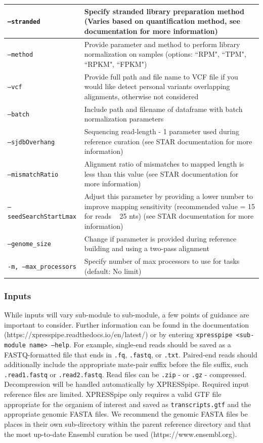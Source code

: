 \documentclass[10pt, oneside]{article}
\begin{document}
\begin{table}[!]
\begin{tabular}{p{5cm}p{13cm}}
 \hline
 \texttt{--stranded} & Specify stranded library preparation method (Varies based on quantification method, see documentation for more information) \\
 \hline
 \texttt{--method} & Provide parameter and method to perform library normalization on samples (options: ``RPM", ``TPM", ``RPKM", ``FPKM") \\
 \hline
 \texttt{--vcf} & Provide full path and file name to VCF file if you would like detect personal variants overlapping alignments, otherwise not considered \\
 \hline
 \texttt{--batch} & Include path and filename of dataframe with batch normalization parameters \\
 \hline
 \texttt{--sjdbOverhang} & Sequencing read-length - 1 parameter used during reference curation (see STAR documentation for more information) \\
 \hline
 \texttt{--mismatchRatio} & Alignment ratio of mismatches to mapped length is less than this value (see STAR documentation for more information) \\
 \hline
 \texttt{--seedSearchStartLmax} & Adjust this parameter by providing a lower number to improve mapping sensitivity (recommended value = 15 for reads ~ 25 nts) (see STAR documentation for more information) \\
 \hline
 \texttt{--genome\_size} & Change if parameter is provided during reference building and using a two-pass alignment \\
 \hline
 \texttt{-m, --max\_processors} & Specify number of max processors to use for tasks (default: No limit) \\
\end{tabular}
\end{table}



\subsubsection{Inputs}
While inputs will vary sub-module to sub-module, a few points of guidance are important to consider. Further information can be found in the documentation (https://xpresspipe.readthedocs.io/en/latest/) or by entering \texttt{xpresspipe \textless sub-module name\textgreater \ --help}. For example, single-end reads should be saved as a FASTQ-formatted file that ends in \texttt{.fq}, \texttt{.fastq}, or \texttt{.txt}. Paired-end reads should additionally include the appropriate mate-pair suffix before the file suffix, such \texttt{.read1.fastq} or \texttt{.read2.fastq}. Read files can be \texttt{.zip} - or \texttt{.gz} - compressed. Decompression will be handled automatically by XPRESSpipe. Required input reference files are limited. XPRESSpipe only requires a valid GTF file appropriate for the organism of interest and saved as \texttt{transcripts.gtf} and the appropriate genomic FASTA files. We recommend the genomic FASTA files be places in their own sub-directory within the parent reference directory and that the most up-to-date Ensembl curation be used (https://www.ensembl.org).
\end{document}
